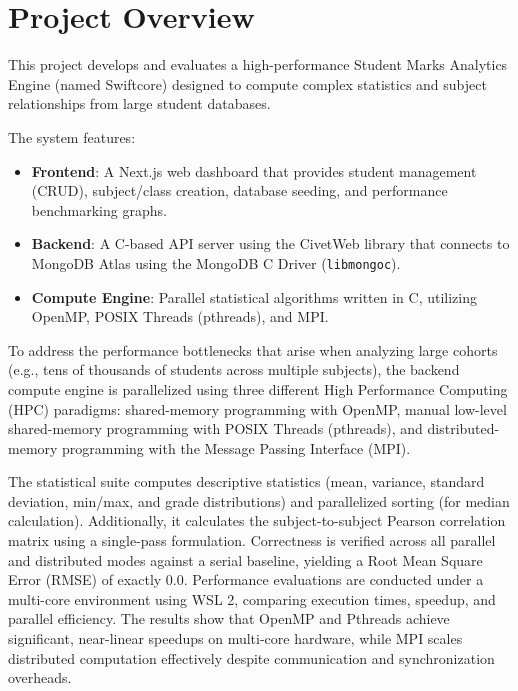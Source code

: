 \documentclass[12pt,a4paper]{article}
\begin{document}
\hypersetup{pageanchor=true}

\tableofcontents
\clearpage

\section{Project Overview}
This project develops and evaluates a high-performance Student Marks Analytics Engine (named Swiftcore) designed to compute complex statistics and subject relationships from large student databases.

The system features:
\begin{itemize}
    \item \textbf{Frontend}: A Next.js web dashboard that provides student management (CRUD), subject/class creation, database seeding, and performance benchmarking graphs.
    \item \textbf{Backend}: A C-based API server using the CivetWeb library that connects to MongoDB Atlas using the MongoDB C Driver (\texttt{libmongoc}).
    \item \textbf{Compute Engine}: Parallel statistical algorithms written in C, utilizing OpenMP, POSIX Threads (pthreads), and MPI.
\end{itemize}

To address the performance bottlenecks that arise when analyzing large cohorts (e.g., tens of thousands of students across multiple subjects), the backend compute engine is parallelized using three different High Performance Computing (HPC) paradigms: shared-memory programming with OpenMP, manual low-level shared-memory programming with POSIX Threads (pthreads), and distributed-memory programming with the Message Passing Interface (MPI).

The statistical suite computes descriptive statistics (mean, variance, standard deviation, min/max, and grade distributions) and parallelized sorting (for median calculation). Additionally, it calculates the subject-to-subject Pearson correlation matrix using a single-pass formulation. Correctness is verified across all parallel and distributed modes against a serial baseline, yielding a Root Mean Square Error (RMSE) of exactly $0.0$. Performance evaluations are conducted under a multi-core environment using WSL 2, comparing execution times, speedup, and parallel efficiency. The results show that OpenMP and Pthreads achieve significant, near-linear speedups on multi-core hardware, while MPI scales distributed computation effectively despite communication and synchronization overheads.
\clearpage
\end{document}
